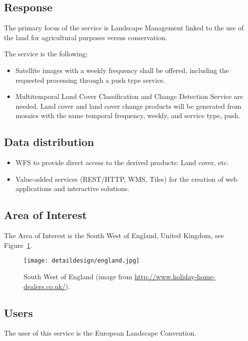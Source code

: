 \subsection{Response}
The primary focus of the service is Landscape Management linked to the use of the land for agricultural purposes versus conservation. 

The service is the following:
\begin{itemize}
\item Satellite images with a weekly frequency shall be offered, including the requested processing through a push type service.
\item Multitemporal Land Cover Classification and Change Detection Service are
  needed. Land cover and land cover change products will be generated from
  mosaics with the same temporal frequency, weekly, and service type, push.
\end{itemize}

\subsection{Data distribution}
\begin{itemize}
\item \ac{WFS} to provide direct access to the derived products: Land cover, etc.
\item Value-added services (REST/HTTP, WMS, Tiles) for the creation of web
  applications and interactive solutions. 
\end{itemize}

\subsection{Area of Interest} 
The Area of Interest is the South West of England, United Kingdom, see Figure~\ref{fig:england}.

 \begin{figure}[!h]
\begin{center}
\texttt{[image: detaildesign/england.jpg]}
\caption[South West of England]{South West of England (image from \url{http://www.holiday-home-dealers.co.uk/}).}
\label{fig:england}
\end{center}
\end{figure}

\subsection{Users}
The user of this service is the European Landscape Convention.
